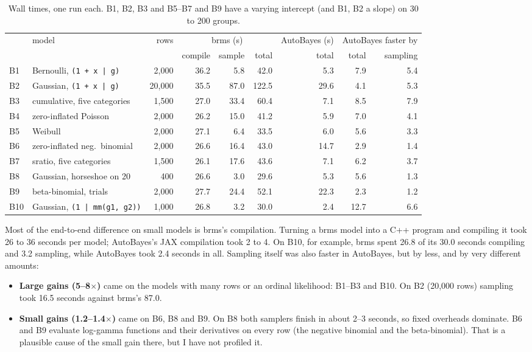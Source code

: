 \documentclass[11pt]{article}
\newcommand{\code}[1]{\texttt{#1}}
\begin{document}
\begin{table}[h]
\footnotesize
\setlength{\tabcolsep}{4pt}
\begin{center}\begin{tabular}{@{}llrrrrrrr@{}}
\toprule
& model & rows & \multicolumn{3}{c}{brms (s)} & AutoBayes (s) & \multicolumn{2}{c}{AutoBayes faster by} \\
\cmidrule(lr){4-6}\cmidrule(lr){8-9}
& & & compile & sample & total & total & total & sampling \\
\midrule
B1 & Bernoulli, \code{(1 + x | g)} & 2,000 & 36.2 & 5.8 & 42.0 & 5.3 & 7.9 & 5.4 \\
B2 & Gaussian, \code{(1 + x | g)} & 20,000 & 35.5 & 87.0 & 122.5 & 29.6 & 4.1 & 5.3 \\
B3 & cumulative, five categories & 1,500 & 27.0 & 33.4 & 60.4 & 7.1 & 8.5 & 7.9 \\
B4 & zero-inflated Poisson & 2,000 & 26.2 & 15.0 & 41.2 & 5.9 & 7.0 & 4.1 \\
B5 & Weibull & 2,000 & 27.1 & 6.4 & 33.5 & 6.0 & 5.6 & 3.3 \\
B6 & zero-inflated neg.\ binomial & 2,000 & 26.6 & 16.4 & 43.0 & 14.7 & 2.9 & 1.4 \\
B7 & sratio, five categories & 1,500 & 26.1 & 17.6 & 43.6 & 7.1 & 6.2 & 3.7 \\
B8 & Gaussian, horseshoe on 20 & 400 & 26.6 & 3.0 & 29.6 & 5.3 & 5.6 & 1.3 \\
B9 & beta-binomial, trials & 2,000 & 27.7 & 24.4 & 52.1 & 22.3 & 2.3 & 1.2 \\
B10 & Gaussian, \code{(1 | mm(g1, g2))} & 1,000 & 26.8 & 3.2 & 30.0 & 2.4 & 12.7 & 6.6 \\
\bottomrule
\end{tabular}\end{center}
\caption{\small Wall times, one run each. B1, B2, B3 and B5--B7 and B9 have a varying intercept (and B1, B2 a slope) on 30
to 200 groups.}\label{tab:time}
\end{table}

\noindent Most of the end-to-end difference on small models is brms's compilation. Turning a brms model into a C++
program and compiling it took 26 to 36 seconds per model; AutoBayes's JAX compilation took 2 to 4. On B10, for example,
brms spent 26.8 of its 30.0 seconds compiling and 3.2 sampling, while AutoBayes took 2.4 seconds in all. Sampling
itself was also faster in AutoBayes, but by less, and by very different amounts:
\begin{itemize}
\item \textbf{Large gains (5--8$\times$)} came on the models with many rows or an ordinal likelihood: B1--B3 and B10. On
  B2 (20,000 rows) sampling took 16.5 seconds against brms's 87.0.
\item \textbf{Small gains (1.2--1.4$\times$)} came on B6, B8 and B9. On B8 both samplers finish in about 2--3 seconds,
  so fixed overheads dominate. B6 and B9 evaluate log-gamma functions and their derivatives on every row (the negative
  binomial and the beta-binomial). That is a plausible cause of the small gain there, but I have not profiled it.
\end{itemize}
\end{document}
